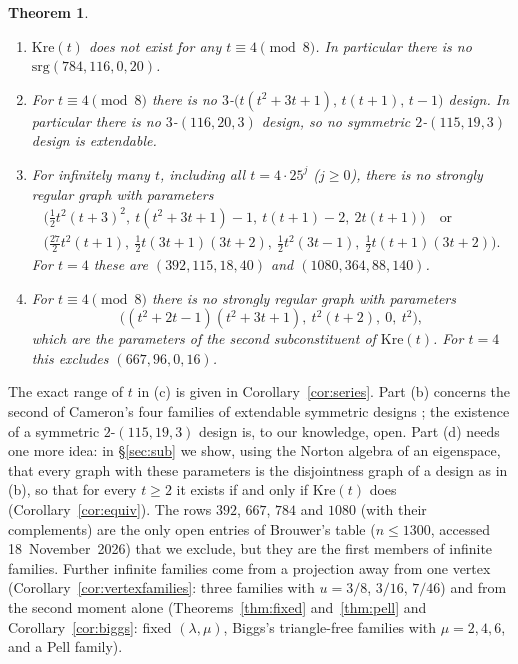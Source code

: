 \documentclass[11pt]{article}
\newtheorem{theorem}{Theorem}[section]
\theoremstyle{definition}
\theoremstyle{remark}
\newcommand{\Kre}{\mathrm{Kre}}
\begin{document}
\begin{theorem}\label{thm:headline}\leavevmode
\begin{enumerate}[label=\textup{(\alph*)}]
\item $\Kre(t)$ does not exist for any $t\equiv4\pmod 8$. In particular there
is no $\mathrm{srg}(784,116,0,20)$.
\item For $t\equiv4\pmod 8$ there is no
$3$-$\bigl(t(t^2+3t+1),\,t(t+1),\,t-1\bigr)$ design. In particular there is no
$3$-$(116,20,3)$ design, so no symmetric $2$-$(115,19,3)$ design is
extendable.
\item For infinitely many $t$, including all $t=4\cdot25^j$
($j\ge0$), there is no strongly regular graph with parameters
\begin{gather*}
\bigl(\tfrac12t^2(t+3)^2,\ t(t^2+3t+1)-1,\ t(t+1)-2,\ 2t(t+1)\bigr)\quad\text{or}\\
\bigl(\tfrac{27}{2}t^2(t+1),\ \tfrac12t(3t+1)(3t+2),\ \tfrac12t^2(3t-1),\
\tfrac12t(t+1)(3t+2)\bigr).
\end{gather*}
For $t=4$ these are $(392,115,18,40)$ and $(1080,364,88,140)$.
\item For $t\equiv4\pmod 8$ there is no strongly regular graph with
parameters
\[
 \bigl((t^2+2t-1)(t^2+3t+1),\ t^2(t+2),\ 0,\ t^2\bigr),
\]
which are the parameters of the second subconstituent of $\Kre(t)$. For
$t=4$ this excludes $(667,96,0,16)$.
\end{enumerate}
\end{theorem}

The exact range of $t$ in (c) is given in Corollary~\ref{cor:series}. Part (b)
concerns the second of Cameron's four families of extendable symmetric designs
\cite{Cameron}; the existence of a symmetric $2$-$(115,19,3)$ design is, to our
knowledge, open. Part (d) needs one more idea: in \S\ref{sec:sub} we show,
using the Norton algebra of an eigenspace, that every graph with these
parameters is the disjointness graph of a design as in (b), so that for every
$t\ge2$ it exists if and only if $\Kre(t)$ does (Corollary~\ref{cor:equiv}).
The rows $392$, $667$, $784$ and $1080$ (with their complements) are the only open entries of
Brouwer's table ($n\le1300$, accessed 18~November~2026) that we exclude, but
they are the first members of infinite families. Further
infinite families come from a projection away from one vertex
(Corollary~\ref{cor:vertexfamilies}: three families with $u=3/8$,
$3/16$, $7/46$) and from the second moment alone (Theorems~\ref{thm:fixed}
and~\ref{thm:pell} and Corollary~\ref{cor:biggs}: fixed $(\lambda,\mu)$,
Biggs's triangle-free families with $\mu=2,4,6$, and a Pell family).
\end{document}
